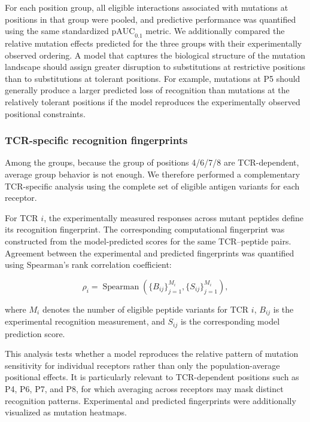 For each position group, all eligible interactions associated with mutations
at positions in that group were pooled, and predictive performance was
quantified using the same standardized $\mathrm{pAUC}_{0.1}$ metric. We
additionally compared the relative mutation effects predicted for the three
groups with their experimentally observed ordering. A model that captures the
biological structure of the mutation landscape should assign greater
disruption to substitutions at restrictive positions than to substitutions at
tolerant positions. For example, mutations at P5 should generally produce a
larger predicted loss of recognition than mutations at the relatively tolerant positions if the model reproduces the experimentally observed
positional constraints.


\subsubsection{TCR-specific recognition fingerprints}
Among the groups, because the group of positions 4/6/7/8 are TCR-dependent, average group behavior is not enough.
We therefore performed a complementary TCR-specific analysis using the complete
set of eligible antigen variants for each receptor.

For TCR $i$, the experimentally measured responses across mutant peptides
define its recognition fingerprint. The corresponding computational
fingerprint was constructed from the model-predicted scores for the same
TCR--peptide pairs. Agreement between the experimental and predicted
fingerprints was quantified using Spearman's rank correlation coefficient:

\begin{equation}
\rho_i
=
\operatorname{Spearman}
\left(
\{B_{ij}\}_{j=1}^{M_i},
\{S_{ij}\}_{j=1}^{M_i}
\right),
\label{eq:fingerprint_spearman}
\end{equation}

where $M_i$ denotes the number of eligible peptide variants for TCR $i$,
$B_{ij}$ is the experimental recognition measurement, and $S_{ij}$ is the
corresponding model prediction score.

This analysis tests whether a model reproduces the relative pattern of
mutation sensitivity for individual receptors rather than only the
population-average positional effects. It is particularly relevant to
TCR-dependent positions such as P4, P6, P7, and P8, for which averaging
across receptors may mask distinct recognition patterns. Experimental and
predicted fingerprints were additionally visualized as mutation heatmaps.


